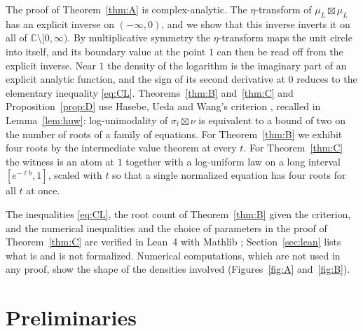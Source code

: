 \documentclass[11pt]{amsart}
\theoremstyle{remark}
\newcommand{\C}{\mathbb C}
\begin{document}
The proof of Theorem~\ref{thm:A} is complex-analytic. The $\eta$-transform of $\mu_L\boxtimes\mu_L$ has an explicit inverse on $(-\infty,0)$, and we show that this inverse inverts it on all of $\C\setminus[0,\infty)$. By multiplicative symmetry the $\eta$-transform maps the unit circle into itself, and its boundary value at the point $1$ can then be read off from the explicit inverse. Near $1$ the density of the logarithm is the imaginary part of an explicit analytic function, and the sign of its second derivative at $0$ reduces to the elementary inequality \eqref{eq:CL}. Theorems~\ref{thm:B} and~\ref{thm:C} and Proposition~\ref{prop:D} use Hasebe, Ueda and Wang's criterion \cite[Lemma~4.1]{HUW}, recalled in Lemma~\ref{lem:huw}: log-unimodality of $\sigma_t\boxtimes\nu$ is equivalent to a bound of two on the number of roots of a family of equations. For Theorem~\ref{thm:B} we exhibit four roots by the intermediate value theorem at every $t$. For Theorem~\ref{thm:C} the witness is an atom at $1$ together with a log-uniform law on a long interval $[e^{-\ell b},1]$, scaled with $t$ so that a single normalized equation has four roots for all $t$ at once.

The inequalities \eqref{eq:CL}, the root count of Theorem~\ref{thm:B} given the criterion, and the numerical inequalities and the choice of parameters in the proof of Theorem~\ref{thm:C} are verified in Lean~4 \cite{Lean} with Mathlib \cite{Mathlib}; Section~\ref{sec:lean} lists what is and is not formalized. Numerical computations, which are not used in any proof, show the shape of the densities involved (Figures~\ref{fig:A} and~\ref{fig:B}).

\section{Preliminaries}\label{sec:prelim}
\end{document}
